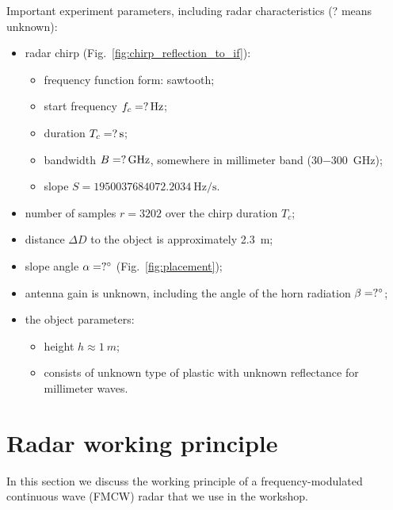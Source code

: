 \documentclass{article}
\begin{document}
Important experiment parameters, including radar characteristics (? means unknown):
\begin{itemize}
    \item radar chirp (Fig.~\ref{fig:chirp_reflection_to_if}):
    \begin{itemize}
        \item frequency function form: sawtooth;
        \item start frequency $f_c = \SI[parse-numbers = false]{?}{\hertz}$;
        \item duration $T_c = \SI[parse-numbers = false]{?}{\second}$;
        \item bandwidth $B = \SI[parse-numbers = false]{?}{\giga\hertz}$, somewhere in millimeter band (\SI[parse-numbers = false]{30-300}{\giga\hertz});
        \item slope $S = \SI{1950037684072.2034}{\hertz\per\second}$.
    \end{itemize}
    \item number of samples $r = 3202$ over the chirp duration $T_c$;
    \item distance $\Delta D$ to the object is approximately \SI{2.3}{m};
    \item slope angle $\alpha = \SI[parse-numbers=false]{?}{\degree}$ (Fig.~\ref{fig:placement});
    \item antenna gain is unknown, including the angle of the horn radiation $\beta = \SI[parse-numbers=false]{?}{\degree}$;
    \item the object parameters:
    \begin{itemize}
        \item height $h \approx \SI{1}{m}$;
        \item consists of unknown type of plastic with unknown reflectance for millimeter waves.
    \end{itemize}
\end{itemize}


\section{Radar working principle}
\label{sec:radar-working-principle}
In this section we discuss the working principle of a frequency-modulated continuous wave (FMCW) radar that we use in the workshop.
\end{document}
